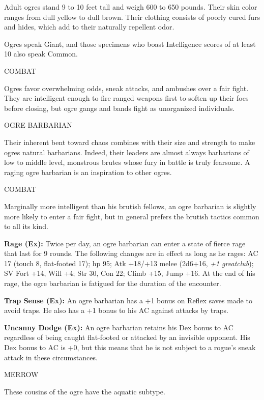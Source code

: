 \documentclass{article}
\begin{document}
\vspace{12pt}
Adult ogres stand 9 to 10 feet tall and weigh 600 to 650 pounds. Their skin color 
ranges from dull yellow to dull brown. Their clothing consists of poorly cured 
furs and hides, which add to their naturally repellent odor.

Ogres speak Giant, and those specimens who boast Intelligence scores of at least 
10 also speak Common.

COMBAT

Ogres favor overwhelming odds, sneak attacks, and ambushes over a fair fight. They 
are intelligent enough to fire ranged weapons first to soften up their foes before 
closing, but ogre gangs and bands fight as unorganized individuals.

\vspace{12pt}
OGRE BARBARIAN

Their inherent bent toward chaos combines with their size and strength to make 
ogres natural barbarians. Indeed, their leaders are almost always barbarians of 
low to middle level, monstrous brutes whose fury in battle is truly fearsome. A 
raging ogre barbarian is an inspiration to other ogres.

COMBAT

Marginally more intelligent than his brutish fellows, an ogre barbarian is slightly 
more likely to enter a fair fight, but in general prefers the brutish tactics common 
to all its kind.

\textbf{Rage (Ex): }Twice per day, an ogre barbarian can enter a state of fierce 
rage that last for 9 rounds. The following changes are in effect as long as he 
rages: AC 17 (touch 8, flat-footed 17); hp 95; Atk +18/+13 melee (2d6+16, \textit{+1 
greatclub}); SV Fort +14, Will +4; Str 30, Con 22; Climb +15, Jump +16. At the 
end of his rage, the ogre barbarian is fatigued for the duration of the encounter.

\textbf{Trap Sense (Ex):} An ogre barbarian has a +1 bonus on Reflex saves made 
to avoid traps. He also has a +1 bonus to his AC against attacks by traps.

\textbf{Uncanny Dodge (Ex): }An ogre barbarian retains his Dex bonus to AC regardless 
of being caught flat-footed or attacked by an invisible opponent. His Dex bonus 
to AC is +0, but this means that he is not subject to a rogue's sneak attack in 
these circumstances.

\vspace{12pt}
MERROW

These cousins of the ogre have the aquatic subtype.
\end{document}
